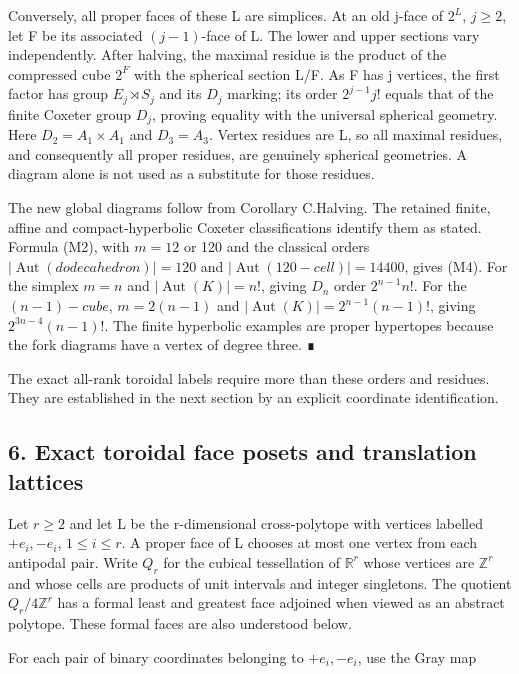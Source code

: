 \documentclass[
  11pt,
  a4paper,
]{article}
\begin{document}
Conversely, all proper faces of these L are simplices. At an old j-face
of \(2^L\), \(j\ge 2\), let F be its associated \((j-1)\)-face of L. The
lower and upper sections vary independently. After halving, the maximal
residue is the product of the compressed cube \(2^F\) with the spherical
section L/F. As F has j vertices, the first factor has group
\(E_j\rtimes S_j\) and its \(D_j\) marking; its order \(2^{j-1}j!\)
equals that of the finite Coxeter group \(D_j\), proving equality with
the universal spherical geometry. Here \(D_{2}=A_{1}\times A_{1}\) and
\(D_{3}=A_{3}\). Vertex residues are L, so all maximal residues, and
consequently all proper residues, are genuinely spherical geometries. A
diagram alone is not used as a substitute for those residues.

The new global diagrams follow from Corollary C.Halving. The retained
finite, affine and compact-hyperbolic Coxeter classifications identify
them as stated. Formula (M2), with \(m=12\) or 120 and the classical
orders \(|\operatorname{Aut}(dodecahedron)|=120\) and
\(|\operatorname{Aut}(120-cell)|=14400\), gives (M4). For the simplex
\(m=n\) and \(|\operatorname{Aut}(K)|=n!\), giving \(D_n\) order
\(2^{n-1}n!\). For the \((n-1)-cube\), \(m=2(n-1)\) and
\(|\operatorname{Aut}(K)|=2^{n-1}(n-1)!\), giving \(2^{3n-4}(n-1)!\).
The finite hyperbolic examples are proper hypertopes because the fork
diagrams have a vertex of degree three. ∎

The exact all-rank toroidal labels require more than these orders and
residues. They are established in the next section by an explicit
coordinate identification.

\subsection{6. Exact toroidal face posets and translation
lattices}\label{exact-toroidal-face-posets-and-translation-lattices}

Let \(r\ge 2\) and let L be the r-dimensional cross-polytope with
vertices labelled \(+e_i,-e_i\), \(1\le i\le r\). A proper face of L
chooses at most one vertex from each antipodal pair. Write \(Q_r\) for
the cubical tessellation of \(\mathbb R^r\) whose vertices are
\(\mathbb Z^r\) and whose cells are products of unit intervals and
integer singletons. The quotient \(Q_r/4\mathbb Z^r\) has a formal least
and greatest face adjoined when viewed as an abstract polytope. These
formal faces are also understood below.

For each pair of binary coordinates belonging to \(+e_i,-e_i\), use the
Gray map
\end{document}
